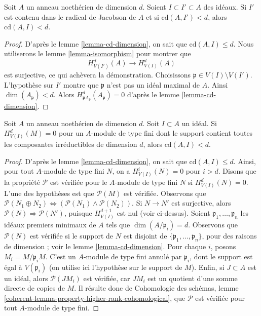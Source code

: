 \begin{lemma}
\label{lemma-cd-top-vanishing}
Soit $A$ un anneau noethérien de dimension $d$. Soient $I \subset I' \subset A$ des idéaux. Si $I'$ est contenu dans le radical de Jacobson de $A$ et si $\text{cd}(A, I') < d$, alors $\text{cd}(A, I) < d$.
\end{lemma}

\begin{proof}
D'après le lemme \ref{lemma-cd-dimension}, on sait que $\text{cd}(A, I) \leq d$. Nous utiliserons le lemme \ref{lemma-isomorphism} pour montrer que
$$
H^d_{V(I')}(A) \to H^d_{V(I)}(A)
$$
est surjective, ce qui achèvera la démonstration. Choisissons $\mathfrak p \in V(I) \setminus V(I')$. L'hypothèse sur $I'$ montre que $\mathfrak p$ n'est pas un idéal maximal de $A$. Ainsi $\dim(A_\mathfrak p) < d$. Alors $H^d_{\mathfrak pA_\mathfrak p}(A_\mathfrak p) = 0$ d'après le lemme \ref{lemma-cd-dimension}.
\end{proof}

\begin{lemma}
\label{lemma-cd-top-vanishing-some-module}
Soit $A$ un anneau noethérien de dimension $d$. Soit $I \subset A$ un idéal. Si $H^d_{V(I)}(M) = 0$ pour un $A$-module de type fini dont le support contient toutes les composantes irréductibles de dimension $d$, alors $\text{cd}(A, I) < d$.
\end{lemma}

\begin{proof}
D'après le lemme \ref{lemma-cd-dimension}, on sait que $\text{cd}(A, I) \leq d$. Ainsi, pour tout $A$-module de type fini $N$, on a $H^i_{V(I)}(N) = 0$ pour $i > d$. Disons que la propriété $\mathcal{P}$ est vérifiée pour le $A$-module de type fini $N$ si $H^d_{V(I)}(N) = 0$. L'une des hypothèses est que $\mathcal{P}(M)$ est vérifiée. Observons que $\mathcal{P}(N_1 \oplus N_2)
\Leftrightarrow (\mathcal{P}(N_1) \wedge \mathcal{P}(N_2))$. Si $N \to N'$ est surjective, alors $\mathcal{P}(N) \Rightarrow \mathcal{P}(N')$, puisque $H^{d + 1}_{V(I)}$ est nul (voir ci-dessus). Soient $\mathfrak p_1, \ldots, \mathfrak p_n$ les idéaux premiers minimaux de $A$ tels que $\dim(A/\mathfrak p_i) = d$. Observons que $\mathcal{P}(N)$ est vérifiée si le support de $N$ est disjoint de $\{\mathfrak p_1, \ldots, \mathfrak p_n\}$, pour des raisons de dimension ; voir le lemme \ref{lemma-cd-dimension}. Pour chaque $i$, posons $M_i = M/\mathfrak p_i M$. C'est un $A$-module de type fini annulé par $\mathfrak p_i$, dont le support est égal à $V(\mathfrak p_i)$ (on utilise ici l'hypothèse sur le support de $M$). Enfin, si $J \subset A$ est un idéal, alors $\mathcal{P}(JM_i)$ est vérifiée, car $JM_i$ est un quotient d'une somme directe de copies de $M$. Il résulte donc de Cohomologie des schémas, lemme \ref{coherent-lemma-property-higher-rank-cohomological}, que $\mathcal{P}$ est vérifiée pour tout $A$-module de type fini.
\end{proof}

